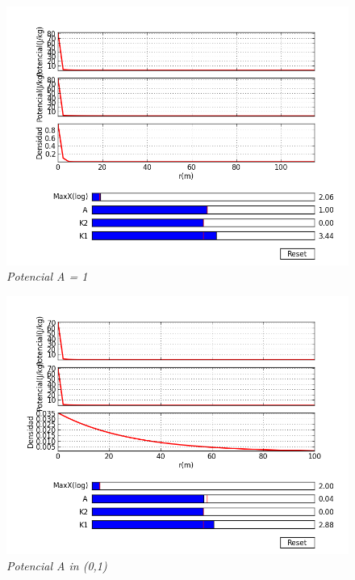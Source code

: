 \documentclass[12pt]{book}
\begin{document}
\begin{figure}[!h]
 \centering
 \includegraphics[scale=0.7]{potencial2.png}
 \caption{\emph{Potencial A = 1}}
 \label{Fig: 2}
\end{figure}


\begin{figure}[!h]
 \centering
 \includegraphics[scale=0.7]{potencial4.png}
 \caption{\emph{Potencial A in (0,1) }}
 \label{Fig: 1}
\end{figure}
\end{document}
